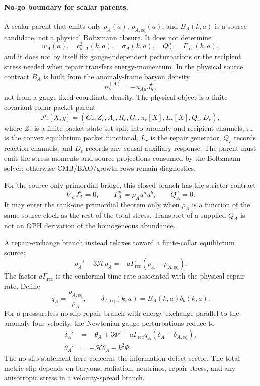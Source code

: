 \documentclass[11pt]{article}
\begin{document}
\paragraph{No-go boundary for scalar parents.}
A scalar parent that emits only
\(\rho_A(a)\), \(\rho_{A,\mathrm{eq}}(a)\), and \(B_A(k,a)\) is a source
candidate, not a physical Boltzmann closure.  It does not determine
\[
  w_A(a),\quad c_{s,A}^2(k,a),\quad \sigma_A(k,a),\quad Q_A^\mu,\quad
  \Gamma_{\mathrm{rec}}(k,a),
\]
and it does not by itself fix gauge-independent perturbations or the recipient
stress needed when repair transfers energy-momentum.  In the physical source
contract \(B_A\) is built from the anomaly-frame baryon density
\[
  n_b^{(A)}=-u_{A\mu}J_b^\mu ,
\]
not from a gauge-fixed coordinate density.  The physical object is a
finite covariant collar-packet parent
\[
  \mathcal P_r[X,g]=(C_r,Z_r,A_r,R_r,G_r,\pi_r[X],L_r[X],Q_r,D_r),
\]
where \(Z_r\) is a finite packet-state set split into anomaly and recipient
channels, \(\pi_r\) is the convex equilibrium packet functional, \(L_r\) is the
repair generator, \(Q_r\) records reaction channels, and \(D_r\) records any
causal auxiliary response.  The parent must emit the stress moments and source
projections consumed by the Boltzmann solver; otherwise CMB/BAO/growth rows
remain diagnostics.

For the source-only primordial bridge, this closed branch has the stricter
contract
\begin{equation}
  \nabla_aJ_A^a=0,\qquad
  T_A^{ab}=\rho_Au^au^b,\qquad
  Q_A^a=0 .
  \label{eq:closed-anomaly-primordial-contract}
\end{equation}
It may enter the rank-one primordial theorem only when \(\rho_A\) is a
function of the same source clock as the rest of the total stress.  Transport
of a supplied \(Q_A\) is not an OPH derivation of the homogeneous abundance.

A repair-exchange branch instead relaxes toward a finite-collar equilibrium
source:
\begin{equation}
  \rho_A' + 3\mathcal H\rho_A
  = -a\Gamma_{\mathrm{rec}}(\rho_A-\rho_{A,\mathrm{eq}}).
  \label{eq:repairbackground}
\end{equation}
The factor \(a\Gamma_{\mathrm{rec}}\) is the conformal-time rate associated
with the physical repair rate.  Define
\begin{equation}
  q_A=\frac{\rho_{A,\mathrm{eq}}}{\rho_A},
  \qquad
  \delta_{A,\mathrm{eq}}(k,a)=B_A(k,a)\delta_b(k,a).
\end{equation}
For a pressureless no-slip repair branch with energy exchange parallel to
the anomaly four-velocity, the Newtonian-gauge perturbations reduce to
\begin{align}
  \delta_A'
    &=-\theta_A+3\Phi'
      -a\Gamma_{\mathrm{rec}}q_A
       (\delta_A-\delta_{A,\mathrm{eq}}),
       \label{eq:deltaA}\\
  \theta_A'
    &=-\mathcal H\theta_A+k^2\Psi.
       \label{eq:thetaA}
\end{align}
The no-slip statement here concerns the information-defect sector.  The total
metric slip depends on baryons, radiation, neutrinos, repair stress, and any
anisotropic stress in a velocity-spread branch.
\end{document}
